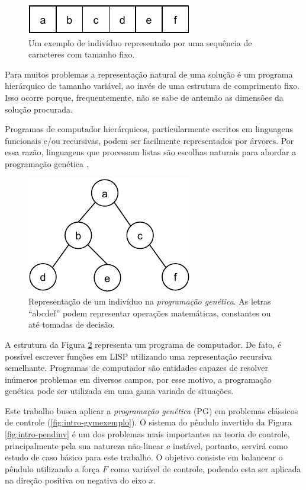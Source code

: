 \begin{figure}[!h]
\centering
\includegraphics[width=0.35\linewidth]{01_introducao/rep_ga.pdf}
\caption{Um exemplo de indivíduo representado por uma sequência de caracteres com tamanho fixo.}
\label{fig:intro-repga}
\end{figure}

Para muitos problemas a representação natural de uma solução é um programa hierárquico de tamanho variável, ao invés de uma estrutura de comprimento fixo. Isso ocorre porque, frequentemente, não se sabe de antemão as dimensões da solução procurada.

Programas de computador hierárquicos, particularmente escritos em linguagens funcionais e/ou recursivas, podem ser facilmente representados por árvores. Por essa razão, linguagens que processam listas são escolhas naturais para abordar a programação genética \cite{koza97bookGp}.

\begin{figure}[!h]
\centering
\includegraphics[width=0.4\linewidth]{01_introducao/rep_gp.pdf}
\caption{Representação de um indivíduo na \textit{programação genética}. As letras ``abcdef'' podem representar operações matemáticas, constantes ou até tomadas de decisão.}
\label{fig:intro-repgp}
\end{figure}

A estrutura da Figura \ref{fig:intro-repgp} representa um programa de computador. De fato, é possível escrever funções em LISP utilizando uma representação recursiva semelhante. Programas de computador são entidades capazes de resolver inúmeros problemas em diversos campos, por esse motivo, a programação genética pode ser utilizada em uma gama variada de situações.

Este trabalho busca aplicar a \textit{programação genética} (PG) em problemas clássicos de controle (\ref{fig:intro-gymexemplo}). O sistema do pêndulo invertido da Figura \ref{fig:intro-pendinv} é um dos problemas mais importantes na teoria de controle, principalmente pela sua natureza não-linear e instável, portanto, servirá como estudo de caso básico para este trabalho. O objetivo consiste em balancear o pêndulo utilizando a força $F$ como variável de controle, podendo esta ser aplicada na direção positiva ou negativa do eixo $x$.


